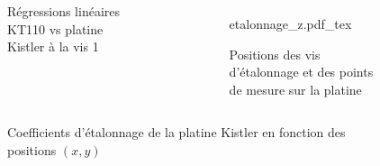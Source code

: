\documentclass{style/presentation}
\begin{document}
\begin{frame}
    \vspace{-5mm}
    \begin{columns}[c]
        \begin{figure}
            \centering
            
            \caption{Régressions linéaires KT110 vs platine Kistler à la vis 1}
        \end{figure}
        \vspace{-3mm}
        
        \begin{figure}
            \centering
            {\fontsize{4pt}{5pt}\selectfont
                \def\svgwidth{\textwidth}
                {etalonnage_z.pdf_tex}}
            \caption{Positions des vis d'étalonnage et des points de mesure sur la platine}
        \end{figure}
    \end{columns}
\end{frame}

\begin{frame}
    \begin{figure}
        \centering
        
        \caption{Coefficients d'étalonnage de la platine Kistler en fonction des positions $(x,y)$}
    \end{figure}
\end{frame}
\end{document}
